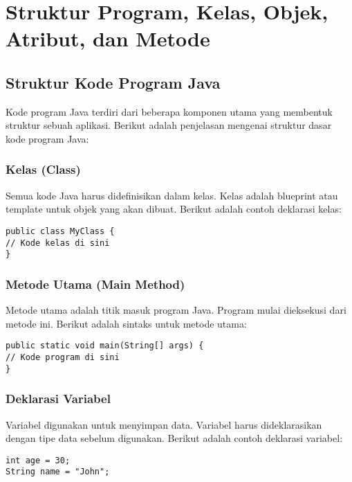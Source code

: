 
\chapter{Struktur Program, Kelas, Objek, Atribut, dan Metode}

\section{Struktur Kode Program Java}

Kode program Java terdiri dari beberapa komponen utama yang membentuk struktur sebuah aplikasi. Berikut adalah penjelasan mengenai struktur dasar kode program Java:

\subsection{Kelas (Class)}

Semua kode Java harus didefinisikan dalam kelas. Kelas adalah blueprint atau template untuk objek yang akan dibuat. Berikut adalah contoh deklarasi kelas:

\begin{lstlisting}[style=JavaStyle]
public class MyClass {
// Kode kelas di sini
}
\end{lstlisting}

\subsection{Metode Utama (Main Method)}

Metode utama adalah titik masuk program Java. Program mulai dieksekusi dari metode ini. Berikut adalah sintaks untuk metode utama:

\begin{lstlisting}[style=JavaStyle]
public static void main(String[] args) {
// Kode program di sini
}
\end{lstlisting}

\subsection{Deklarasi Variabel}

Variabel digunakan untuk menyimpan data. Variabel harus dideklarasikan dengan tipe data sebelum digunakan. Berikut adalah contoh deklarasi variabel:

\begin{lstlisting}[style=JavaStyle]
int age = 30;
String name = "John";
\end{lstlisting}

